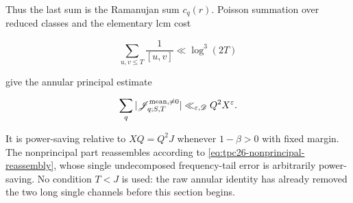 Thus the last sum is the Ramanujan sum \(c_q(r)\).  Poisson summation
over reduced classes and the elementary lcm cost

\begin{equation}
 \sum_{u,v\le T}\frac1{[u,v]}
 \ll\log^3(2T)
 \label{eq:tpc26-lcm-cost}
\end{equation}

give the annular principal estimate

\begin{equation}
 \sum_q|\mathscr J_{q;S,T}^{\rm mean,\ne0}|
 \ll_{\varepsilon,\mathscr D}Q^2X^\varepsilon.
 \label{eq:tpc26-principal-mean}
\end{equation}

It is power-saving relative to \(XQ=Q^2J\) whenever \(1-\beta>0\)
with fixed margin.  The nonprincipal part reassembles according to
\eqref{eq:tpc26-nonprincipal-reassembly}, whose single undecomposed
frequency-tail error is arbitrarily power-saving.  No condition \(T<J\)
is used: the
raw annular identity has already removed the two long single channels
before this section begins.
